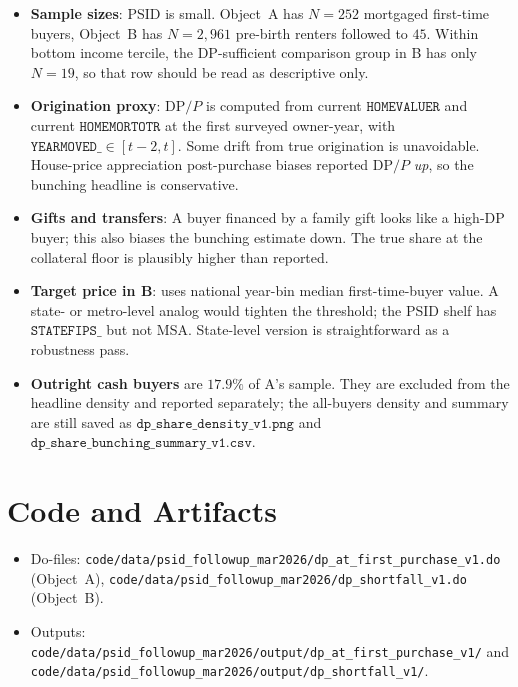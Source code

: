 \documentclass[11pt]{article}
\begin{document}
\begin{itemize}
  \item \textbf{Sample sizes}: PSID is small. Object~A has $N = 252$ mortgaged first-time buyers, Object~B has $N = 2{,}961$ pre-birth renters followed to $45$. Within bottom income tercile, the DP-sufficient comparison group in B has only $N = 19$, so that row should be read as descriptive only.
  \item \textbf{Origination proxy}: $\mathrm{DP}/P$ is computed from current $\texttt{HOMEVALUER}$ and current $\texttt{HOMEMORTOTR}$ at the first surveyed owner-year, with $\texttt{YEARMOVED\_} \in [t-2, t]$. Some drift from true origination is unavoidable. House-price appreciation post-purchase biases reported $\mathrm{DP}/P$ \emph{up}, so the bunching headline is conservative.
  \item \textbf{Gifts and transfers}: A buyer financed by a family gift looks like a high-DP buyer; this also biases the bunching estimate down. The true share at the collateral floor is plausibly higher than reported.
  \item \textbf{Target price in B}: uses national year-bin median first-time-buyer value. A state- or metro-level analog would tighten the threshold; the PSID shelf has $\texttt{STATEFIPS\_}$ but not MSA. State-level version is straightforward as a robustness pass.
  \item \textbf{Outright cash buyers} are $17.9\%$ of A's sample. They are excluded from the headline density and reported separately; the all-buyers density and summary are still saved as $\texttt{dp\_share\_density\_v1.png}$ and $\texttt{dp\_share\_bunching\_summary\_v1.csv}$.
\end{itemize}

\section{Code and Artifacts}

\begin{itemize}
  \item Do-files:
  \texttt{code/data/psid\_followup\_mar2026/dp\_at\_first\_purchase\_v1.do} (Object~A),
  \texttt{code/data/psid\_followup\_mar2026/dp\_shortfall\_v1.do} (Object~B).
  \item Outputs:
  \texttt{code/data/psid\_followup\_mar2026/output/dp\_at\_first\_purchase\_v1/} and
  \texttt{code/data/psid\_followup\_mar2026/output/dp\_shortfall\_v1/}.
\end{itemize}
\end{document}

